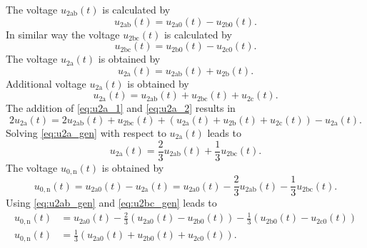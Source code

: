 \begin{solutionblock}
    The voltage $u_{\mathrm{2ab}}(t)$ is calculated by 
    \begin{equation}
        u_{\mathrm{2ab}}(t) =  u_{\mathrm{2a0}}(t) - u_{\mathrm{2b0}}(t).
        \label{eq:u2ab_gen}        
    \end{equation}    
    In similar way the voltage $u_{\mathrm{2bc}}(t)$ is calculated by
    \begin{equation}
        u_{\mathrm{2bc}}(t) =  u_{\mathrm{2b0}}(t) - u_{\mathrm{2c0}}(t).
        \label{eq:u2bc_gen}        
    \end{equation}    
    The voltage $u_{\mathrm{2a}}(t)$ is obtained by
    \begin{equation}
        u_{\mathrm{2a}}(t) =  u_{\mathrm{2ab}}(t) + u_{\mathrm{2b}}(t).
        \label{eq:u2a_1}        
    \end{equation}    
    Additional voltage $u_{\mathrm{2a}}(t)$ is obtained by
    \begin{equation}
        u_{\mathrm{2a}}(t) =  u_{\mathrm{2ab}}(t) +  u_{\mathrm{2bc}}(t) + u_{\mathrm{2c}}(t).
        \label{eq:u2a_2}        
    \end{equation}    
    The addition of \eqref{eq:u2a_1} and \eqref{eq:u2a_2} results in
    \begin{equation}
        2u_{\mathrm{2a}}(t) =  2u_{\mathrm{2ab}}(t) +  u_{\mathrm{2bc}}(t) 
                               + \left( u_{\mathrm{2a}}(t) + u_{\mathrm{2b}}(t) + u_{\mathrm{2c}}(t)\right)
                               - u_{\mathrm{2a}}(t).
        \label{eq:u2a_gen}        
    \end{equation}    
    Solving \eqref{eq:u2a_gen} with respect to $u_{\mathrm{2a}}(t)$ leads to
    \begin{equation}
        u_{\mathrm{2a}}(t) = \frac{2}{3} u_{\mathrm{2ab}}(t) + \frac{1}{3} u_{\mathrm{2bc}}(t).
    \end{equation}    
    The voltage $u_{\mathrm{0,n}}(t)$ is obtained by    
    \begin{equation}
        u_{\mathrm{0,n}}(t) = u_{\mathrm{2a0}}(t) - u_{\mathrm{2a}}(t)
        = u_{\mathrm{2a0}}(t) - \frac{2}{3} u_{\mathrm{2ab}}(t) - \frac{1}{3} u_{\mathrm{2bc}}(t).
    \end{equation}
    Using \eqref{eq:u2ab_gen} and \eqref{eq:u2bc_gen} leads to
    \begin{equation}
        \begin{split}
        u_{\mathrm{0,n}}(t) &= u_{\mathrm{2a0}}(t) - \frac{2}{3} \left( u_{\mathrm{2a0}}(t) - u_{\mathrm{2b0}}(t) \right) 
        - \frac{1}{3} \left( u_{\mathrm{2b0}}(t) - u_{\mathrm{2c0}}(t) \right) \\
        u_{\mathrm{0,n}}(t) &= \frac{1}{3} \left( u_{\mathrm{2a0}}(t) + u_{\mathrm{2b0}}(t) + u_{\mathrm{2c0}}(t) \right).
        \end{split}
    \end{equation}


\end{solutionblock}
